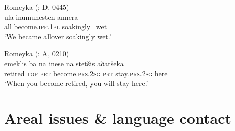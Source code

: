 \documentclass[output=paper,colorlinks,citecolor=brown]{langscibook}
\begin{document}
\ea\label{Romeyka:ex:60}
Romeyka (\citealt{schreiber2021pontic}: D, 0445) \\
\gll ula inumunesten annera \\
all become\textsc{.ipf.1pl} soakingly\_wet \\
\glt `We became allover soakingly wet.'  \\
\z

\ea\label{Romeyka:ex:61}
Romeyka (\citealt{schreiber2021pontic}: A, 0210) \\
\gll emeklis ba na inese na stetšis aðatšeka \\
retired \textsc{top} \textsc{prt} become\textsc{.prs.2sg} \textsc{prt} stay\textsc{.prs.2sg} here \\
\glt 	`When you become retired, you will stay here.'  \\
\z

\section{Areal issues \& language contact}\label{Romeyka:ss:5}
\end{document}
